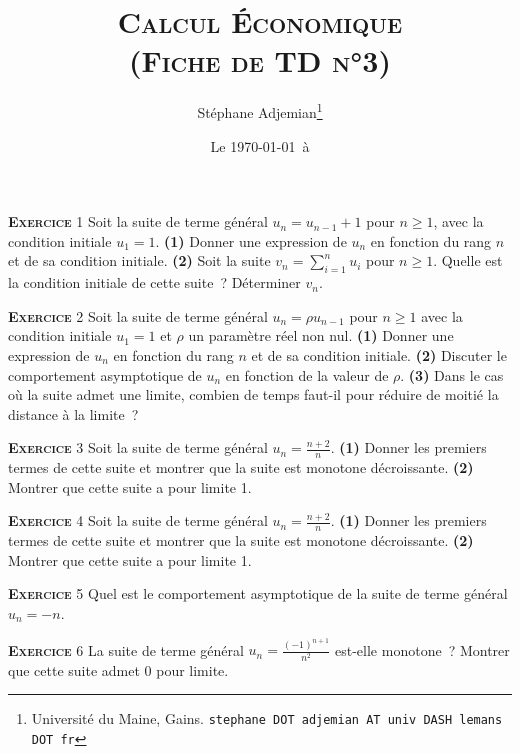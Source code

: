 \documentclass[10pt,a4paper,notitlepage]{article}
\newcommand{\exercice}[1]{\textsc{\textbf{Exercice}} #1}
\begin{document}
\title{\textsc{Calcul Économique\\ \small{(Fiche de TD n°3)}}}
\author{Stéphane Adjemian\thanks{Université du Maine, Gains. \texttt{stephane DOT adjemian AT univ DASH lemans DOT fr}}}
\date{Le \today\ à \thistime}

\maketitle

\exercice{1} Soit la suite de terme général $u_n = u_{n-1} + 1$ pour
$n \geq 1$, avec la condition initiale $u_1 = 1$. \textbf{(1)} Donner
une expression de $u_n$ en fonction du rang $n$ et de sa condition
initiale. \textbf{(2)} Soit la suite $v_n = \sum_{i=1}^n u_i$ pour
$n\geq 1$. Quelle est la condition initiale de cette suite ?
Déterminer $v_n$.

\bigskip

\exercice{2} Soit la suite de terme général $u_n = \rho u_{n-1}$ pour
$n \geq 1$ avec la condition initiale $u_1 = 1$ et $\rho$ un paramètre
réel non nul. \textbf{(1)} Donner une expression de $u_n$ en fonction
du rang $n$ et de sa condition initiale. \textbf{(2)} Discuter le
comportement asymptotique de $u_n$ en fonction de la valeur de
$\rho$. \textbf{(3)} Dans le cas où la suite admet une limite, combien
de temps faut-il pour réduire de moitié la distance à la limite ?

\bigskip

\exercice{3} Soit la suite de terme général $u_n =
\frac{n+2}{n}$. \textbf{(1)} Donner les premiers termes de cette suite
et montrer que la suite est monotone décroissante. \textbf{(2)}
Montrer que cette suite a pour limite 1.

\bigskip

\exercice{4} Soit la suite de terme général $u_n =
\frac{n+2}{n}$. \textbf{(1)} Donner les premiers termes de cette suite
et montrer que la suite est monotone décroissante. \textbf{(2)}
Montrer que cette suite a pour limite 1.

\bigskip

\exercice{5} Quel est le comportement asymptotique de la suite de
terme général $u_n = -n$.

\bigskip

\exercice{6} La suite de terme général $u_n = \frac{(-1)^{n+1}}{n^2}$
est-elle monotone ? Montrer que cette suite admet 0 pour limite.

\bigskip
\end{document}
